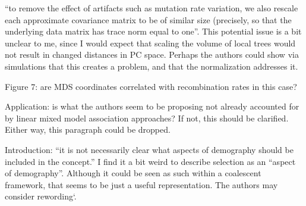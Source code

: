 
\begin{point}{}
``to remove the effect of artifacts such as mutation rate variation, we also rescale each
approximate covariance matrix to be of similar size (precisely, so that the underlying data
matrix has trace norm equal to one''. This potential issue is a bit unclear to me, since I would
expect that scaling the volume of local trees would not result in changed distances in PC
space. Perhaps the authors could show via simulations that this creates a problem, and that the
normalization addresses it.
\end{point}

\begin{point}{Figure 7:}
are MDS coordinates correlated with recombination rates in this case?
\end{point}


\begin{point}{Application:}
 is what the authors seem to be proposing not already accounted for by linear
mixed model association approaches? If not, this should be clarified. Either way, this paragraph
could be dropped.
\end{point}

\begin{point}{Introduction:}
 ``it is not necessarily clear what aspects of demography should be included in the
concept.'' I find it a bit weird to describe selection as an ``aspect of demography''. Although it
could be seen as such within a coalescent framework, that seems to be just a useful
representation. The authors may consider rewording`.
\end{point}

